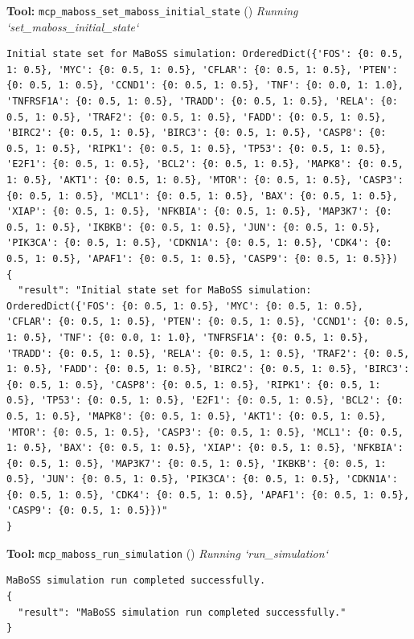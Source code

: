 \documentclass[11pt,a4paper]{article}
\begin{document}
\begin{toolokbox}
\textbf{Tool:} \texttt{mcp\_maboss\_set\_maboss\_initial\_state} (\checkmark)
\textit{Running `set\_maboss\_initial\_state`}
\begin{lstlisting}
Initial state set for MaBoSS simulation: OrderedDict({'FOS': {0: 0.5, 1: 0.5}, 'MYC': {0: 0.5, 1: 0.5}, 'CFLAR': {0: 0.5, 1: 0.5}, 'PTEN': {0: 0.5, 1: 0.5}, 'CCND1': {0: 0.5, 1: 0.5}, 'TNF': {0: 0.0, 1: 1.0}, 'TNFRSF1A': {0: 0.5, 1: 0.5}, 'TRADD': {0: 0.5, 1: 0.5}, 'RELA': {0: 0.5, 1: 0.5}, 'TRAF2': {0: 0.5, 1: 0.5}, 'FADD': {0: 0.5, 1: 0.5}, 'BIRC2': {0: 0.5, 1: 0.5}, 'BIRC3': {0: 0.5, 1: 0.5}, 'CASP8': {0: 0.5, 1: 0.5}, 'RIPK1': {0: 0.5, 1: 0.5}, 'TP53': {0: 0.5, 1: 0.5}, 'E2F1': {0: 0.5, 1: 0.5}, 'BCL2': {0: 0.5, 1: 0.5}, 'MAPK8': {0: 0.5, 1: 0.5}, 'AKT1': {0: 0.5, 1: 0.5}, 'MTOR': {0: 0.5, 1: 0.5}, 'CASP3': {0: 0.5, 1: 0.5}, 'MCL1': {0: 0.5, 1: 0.5}, 'BAX': {0: 0.5, 1: 0.5}, 'XIAP': {0: 0.5, 1: 0.5}, 'NFKBIA': {0: 0.5, 1: 0.5}, 'MAP3K7': {0: 0.5, 1: 0.5}, 'IKBKB': {0: 0.5, 1: 0.5}, 'JUN': {0: 0.5, 1: 0.5}, 'PIK3CA': {0: 0.5, 1: 0.5}, 'CDKN1A': {0: 0.5, 1: 0.5}, 'CDK4': {0: 0.5, 1: 0.5}, 'APAF1': {0: 0.5, 1: 0.5}, 'CASP9': {0: 0.5, 1: 0.5}})
{
  "result": "Initial state set for MaBoSS simulation: OrderedDict({'FOS': {0: 0.5, 1: 0.5}, 'MYC': {0: 0.5, 1: 0.5}, 'CFLAR': {0: 0.5, 1: 0.5}, 'PTEN': {0: 0.5, 1: 0.5}, 'CCND1': {0: 0.5, 1: 0.5}, 'TNF': {0: 0.0, 1: 1.0}, 'TNFRSF1A': {0: 0.5, 1: 0.5}, 'TRADD': {0: 0.5, 1: 0.5}, 'RELA': {0: 0.5, 1: 0.5}, 'TRAF2': {0: 0.5, 1: 0.5}, 'FADD': {0: 0.5, 1: 0.5}, 'BIRC2': {0: 0.5, 1: 0.5}, 'BIRC3': {0: 0.5, 1: 0.5}, 'CASP8': {0: 0.5, 1: 0.5}, 'RIPK1': {0: 0.5, 1: 0.5}, 'TP53': {0: 0.5, 1: 0.5}, 'E2F1': {0: 0.5, 1: 0.5}, 'BCL2': {0: 0.5, 1: 0.5}, 'MAPK8': {0: 0.5, 1: 0.5}, 'AKT1': {0: 0.5, 1: 0.5}, 'MTOR': {0: 0.5, 1: 0.5}, 'CASP3': {0: 0.5, 1: 0.5}, 'MCL1': {0: 0.5, 1: 0.5}, 'BAX': {0: 0.5, 1: 0.5}, 'XIAP': {0: 0.5, 1: 0.5}, 'NFKBIA': {0: 0.5, 1: 0.5}, 'MAP3K7': {0: 0.5, 1: 0.5}, 'IKBKB': {0: 0.5, 1: 0.5}, 'JUN': {0: 0.5, 1: 0.5}, 'PIK3CA': {0: 0.5, 1: 0.5}, 'CDKN1A': {0: 0.5, 1: 0.5}, 'CDK4': {0: 0.5, 1: 0.5}, 'APAF1': {0: 0.5, 1: 0.5}, 'CASP9': {0: 0.5, 1: 0.5}})"
}
\end{lstlisting}
\end{toolokbox}
\begin{toolokbox}
\textbf{Tool:} \texttt{mcp\_maboss\_run\_simulation} (\checkmark)
\textit{Running `run\_simulation`}
\begin{lstlisting}
MaBoSS simulation run completed successfully.
{
  "result": "MaBoSS simulation run completed successfully."
}
\end{lstlisting}
\end{toolokbox}
\end{document}
